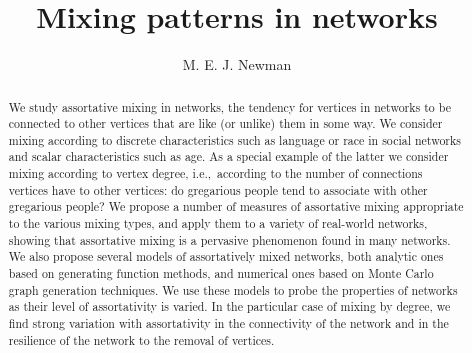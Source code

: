 \documentclass[twocolumn,pre]{revtex4}
\begin{document}
\renewcommand{\d}{{\rm d}}
\renewcommand{\i}{{\rm i}}
\renewcommand{\O}{{\rm O}}
\newcommand{\e}{{\rm e}}
\newcommand{\defn}{\textit}
\newcommand{\half}{\mbox{$\frac12$}}
\newcommand{\set}[1]{\lbrace#1\rbrace}
\newcommand{\av}[1]{\langle#1\rangle}
\newcommand{\eref}[1]{(\ref{#1})}
\newcommand{\etal}{{\it{}et~al.}}
\newcommand{\ve}{\mathbf{e}}
\newcommand{\vx}{\mathbf{x}}
\newcommand{\vs}{\mathbf{s}}
\newcommand{\vH}{\mathbf{H}}
\newcommand{\vone}{\mathbf{1}}
\newcommand{\vm}{\mathbf{m}}
\newcommand{\vI}{\mathbf{I}}
\newcommand{\vA}{\mathbf{A}}
\newcommand{\Tr}{\mathop{\rm Tr}}
\newcommand{\cov}{\mathop{\rm cov}}
\newcommand{\var}{\mathop{\rm var}}
\newcommand{\Li}{\mathop{\rm Li}}
\newcommand{\norm}[1]{\|\,#1\,\|}
\newcommand{\phm}{\phantom{-}}

\newlength{\figurewidth}
\ifdim\columnwidth<10.5cm
  \setlength{\figurewidth}{0.95\columnwidth}
\else
  \setlength{\figurewidth}{10cm}
\fi
\setlength{\parskip}{0pt}
\setlength{\tabcolsep}{6pt}


\title{Mixing patterns in networks}
\author{M. E. J. Newman}
\begin{abstract}
We study assortative mixing in networks, the tendency for vertices in
networks to be connected to other vertices that are like (or unlike) them
in some way.  We consider mixing according to discrete characteristics such
as language or race in social networks and scalar characteristics such as
age.  As a special example of the latter we consider mixing according to
vertex degree, i.e.,~according to the number of connections vertices have
to other vertices: do gregarious people tend to associate with other
gregarious people?  We propose a number of measures of assortative mixing
appropriate to the various mixing types, and apply them to a variety of
real-world networks, showing that assortative mixing is a pervasive
phenomenon found in many networks.  We also propose several models of
assortatively mixed networks, both analytic ones based on generating
function methods, and numerical ones based on Monte Carlo graph generation
techniques.  We use these models to probe the properties of networks as
their level of assortativity is varied.  In the particular case of mixing
by degree, we find strong variation with assortativity in the connectivity
of the network and in the resilience of the network to the removal of
vertices.
\end{abstract}
\maketitle
\end{document}
